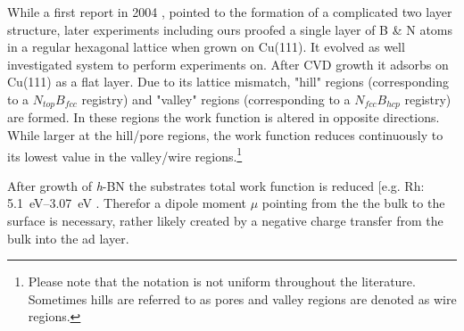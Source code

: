 While a first report in 2004 \cite{corso_boron_2004}, pointed to the formation of a complicated two layer structure, later experiments \cite{roth_chemical_2013, li_grain_2015} including ours \cite{joshi_boron_2012, schwarz_corrugation_2017} proofed a single layer of B \& N atoms in a regular hexagonal lattice when grown on Cu(111). It evolved as well investigated system to perform experiments on. After CVD growth it adsorbs on Cu(111) as a flat layer. Due to its  lattice mismatch, "hill" regions  (corresponding to a $N_{top}B_{fcc}$ registry) and "valley" regions (corresponding to a $N_{fcc}B_{hcp}$ registry) are formed. In these regions the work function is altered in opposite directions. While larger at the hill/pore regions, the work function reduces continuously to its lowest value in the valley/wire regions.\footnote{Please note that the notation is not uniform throughout the literature. Sometimes hills are referred to as pores and valley regions are denoted as wire regions.} 

After growth of \textit{h}-BN the substrates total work function is reduced [e.g. Rh: \SIrange{5.1}{3.07}{\eV} \cite{gomez_diaz_hexagonal_2013}. Therefor a dipole moment $\mu$ pointing from the the bulk to the surface is necessary, rather likely created by a negative charge transfer from the bulk into the ad layer.\cite{roman_periodic_2013}

